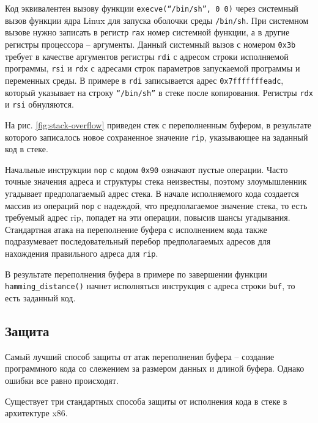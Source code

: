 Код эквивалентен вызову функции \texttt{execve(``/bin/sh'', 0 0)} через системный вызов функции ядра Linux для запуска оболочки среды \texttt{/bin/sh}. При системном вызове нужно записать в регистр \texttt{rax} номер системной функции, а в другие регистры процессора -- аргументы. Данный системный вызов с номером \texttt{0x3b} требует в качестве аргументов регистры \texttt{rdi} с адресом строки исполняемой программы, \texttt{rsi} и \texttt{rdx} с адресами строк параметров запускаемой программы и переменных среды. В примере в \texttt{rdi} записывается адрес \texttt{0x7fffffffeadc}, который указывает на строку \texttt{``/bin/sh''} в стеке после копирования. Регистры \texttt{rdx} и \texttt{rsi} обнуляются.

На рис. \ref{fig:stack-overflow} приведен стек с переполненным буфером, в результате которого записалось новое сохраненное значение \texttt{rip}, указывающее на заданный код в стеке.

Начальные инструкции \texttt{nop} с кодом \texttt{0x90} означают пустые операции. Часто точные значения адреса и структуры стека неизвестны, поэтому злоумышленник угадывает предполагаемый адрес стека. В начале исполняемого кода создается массив из операций \texttt{nop} с надеждой, что предполагаемое значение стека, то есть требуемый адрес rip, попадет на эти операции, повысив шансы угадывания. Стандартная атака на переполнение буфера с исполнением кода также подразумевает последовательный перебор предполагаемых адресов для нахождения правильного адреса для \texttt{rip}.

В результате переполнения буфера в примере по завершении функции \texttt{hamming\_distance()} начнет исполняться инструкция с адреса строки \texttt{buf}, то есть заданный код.


\subsection{Защита}

Самый лучший способ защиты от атак переполнения буфера -- создание программного кода со слежением за размером данных и длиной буфера. Однако ошибки все равно происходят.

Существует три стандартных способа защиты от исполнения кода в стеке в архитектуре x86.

